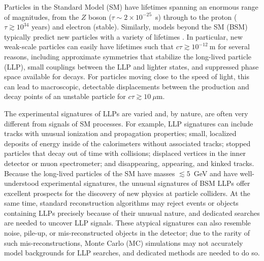 
\noindent Particles in the Standard Model (SM) have lifetimes spanning an enormous range of magnitudes, from the $Z$ boson ($\tau\sim2\times10^{-25}$~s) through to the proton ($\tau\gtrsim10^{34}$ years) and electron (stable).
Similarly, models beyond the SM (BSM) typically predict new particles with a variety of lifetimes \cite{massive-cite-dump}.
In particular, new weak-scale particles can easily have lifetimes such that $c\tau\gtrsim 10^{-12}~\mathrm{m}$ for several reasons, including approximate symmetries that stabilize the long-lived particle (LLP), small couplings between the LLP and lighter states, and suppressed phase space available for decays.
For particles moving close to the speed of light, this can lead to macroscopic, detectable displacements between the production and decay points of an unstable particle for $c\tau\gtrsim 10~\mu\mathrm{m}$.

The experimental signatures of LLPs are varied and, by nature, are often very different from signals of SM processes.  For example, LLP signatures can include tracks with unusual ionization and propagation properties; small, localized deposits of energy inside of the calorimeters without associated tracks; stopped particles that decay out of time with collisions; displaced vertices in the inner detector or muon spectrometer; and disappearing, appearing, and kinked tracks.
Because the long-lived particles of the SM have masses $\lesssim5$~GeV and have well-understood experimental signatures, the unusual signatures of BSM LLPs offer excellent prospects for the discovery of new physics at particle colliders.
At the same time, standard reconstruction algorithms may reject events or objects containing LLPs precisely because of their unusual nature, and dedicated searches are needed to uncover LLP signals.
These atypical signatures can also resemble noise, pile-up, or mis-reconstructed objects in the detector; due to the rarity of such mis-reconstructions, Monte Carlo (MC) simulations may not accurately model backgrounds for LLP searches, and dedicated methods are needed to do so.

